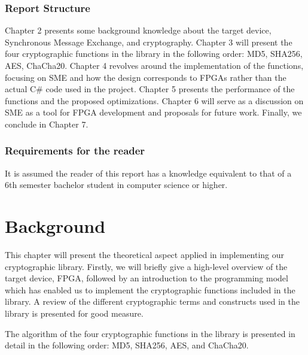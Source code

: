 \documentclass[a4paper, openany]{book}
\begin{document}
\subsection{Report Structure}
\label{sec:org2f5c852}
Chapter 2 presents some background knowledge about the target device, Synchronous Message Exchange, and cryptography. Chapter 3 will present the four cryptographic functions in the library in the following order: MD5, SHA256, AES, ChaCha20. Chapter 4 revolves around the implementation of the functions, focusing on SME and how the design corresponds to FPGAs rather than the actual C\# code used in the project. Chapter 5 presents the performance of the functions and the proposed optimizations. Chapter 6 will serve as a discussion on SME as a tool for FPGA development and proposals for future work. Finally, we conclude in Chapter 7.

\subsection{Requirements for the reader}
\label{sec:orgda3a86c}
It is assumed the reader of this report has a knowledge equivalent to that of a 6th semester bachelor student in computer science or higher.

\chapter{Background}
\label{sec:orgb262de7}
This chapter will present the theoretical aspect applied in implementing our cryptographic library. Firstly, we will briefly give a high-level overview of the target device, FPGA, followed by an introduction to the programming model which has enabled us to implement the cryptographic functions included in the library. A review of the different cryptographic terms and constructs used in the library is presented for good measure.

The algorithm of the four cryptographic functions in the library is presented in detail in the following order: MD5, SHA256, AES, and ChaCha20.
\end{document}
